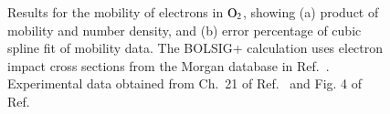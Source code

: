 \documentclass{warpdoc}
\let\citen\cite
\begin{document}
%
\begin{figure}
\centering
{}
\caption{Results for the mobility of electrons in ${\rm O_2}$, showing (a) product of mobility and number density, and (b) error percentage of cubic spline fit of  mobility data. The BOLSIG+ calculation uses electron impact cross sections from the Morgan database in Ref.\ \citen{jcp:2012:morgan}. Experimental data obtained from Ch.\ 21 of Ref.\ \citen{book:1997:grigoriev} and Fig. 4 of Ref.\ \citen{ajp:1973:crompton}}
\label{fig:mobility_O2}
\end{figure}
\end{document}
